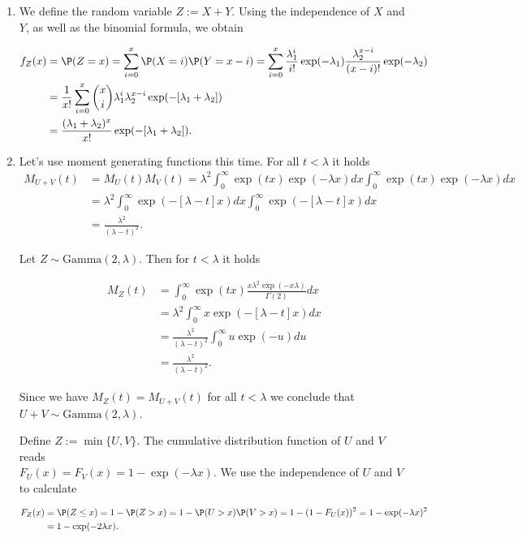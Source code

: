 \begin{solution}

\phantom{}

\begin{enumerate}[label = (\alph*)]
  \item We define the random variable $Z := X + Y$.
  Using the independence of $X$ and $Y$, as well as the binomial formula, we obtain

  \begin{align*}
    f_Z(x) &= \P(Z = x) = \sum_{i=0}^x \P(X = i)\P(Y = x - i) =
    \sum_{i=0}^x \frac{\lambda_1^i}{i!}\exp(-\lambda_1)\frac{\lambda_2^{x-i}}{(x-i)!}\exp(-\lambda_2) \\
    &= \frac{1}{x!}\sum_{i=0}^x\binom{x}{i} \lambda_1^i\lambda_2^{x-i}\exp(-[\lambda_1 +\lambda_2]) \\
    &= \frac{(\lambda_1 + \lambda_2)^x}{x!}\exp(-[\lambda_1 +\lambda_2]).
  \end{align*}

  \item Let's use moment generating functions this time. For all $t < \lambda$ it holds
  \begin{align*}
    M_{U+V}(t) &= M_U(t)M_V(t) = \lambda^2 \int_0^{\infty}\exp(tx)\exp(-\lambda x) dx
  \int_0^{\infty}\exp(tx)\exp(-\lambda x) dx \\
    &=\lambda^2 \int_0^{\infty}\exp(-[\lambda-t] x) dx
  \int_0^{\infty}\exp(-[\lambda -t] x) dx \\
  &= \frac{\lambda^2}{(\lambda-t)^2}.
  \end{align*}

  Let $Z \sim \text{Gamma}(2,\lambda)$. Then for $t < \lambda$ it holds

  \begin{align*}
    M_Z(t) &= \int_0^\infty \exp(tx) \frac{x\lambda^2\exp(-x\lambda)}{\Gamma(2)} dx \\
    &= \lambda^2\int_0^\infty  x\exp(-[\lambda -t]x) dx \\
    &= \frac{\lambda^2}{(\lambda - t)^2}\int_0^\infty  u\exp(-u) du \\
    &= \frac{\lambda^2}{(\lambda - t)^2}.
  \end{align*}

  Since we have $M_Z(t) = M_{U+V}(t)$ for all $t < \lambda$ we conclude that
  $U + V \sim \text{Gamma}(2,\lambda)$.


  Define $Z := \min\{U,V\}$. The cumulative distribution function of $U$ and $V$
  reads \\ $F_U(x) = F_V(x) = 1 - \exp(-\lambda x)$.
  We use the independence of $U$ and $V$ to calculate

  \begin{align*}
    F_Z(x) &= \P(Z \leq x) = 1 - \P(Z > x) = 1 - \P(U > x)\P(V > x) = 1 - (1 - F_U(x))^2
    = 1 - \exp(-\lambda x)^2\\
    &= 1 - \exp(-2\lambda x).
  \end{align*}
\end{enumerate}

\end{solution}

